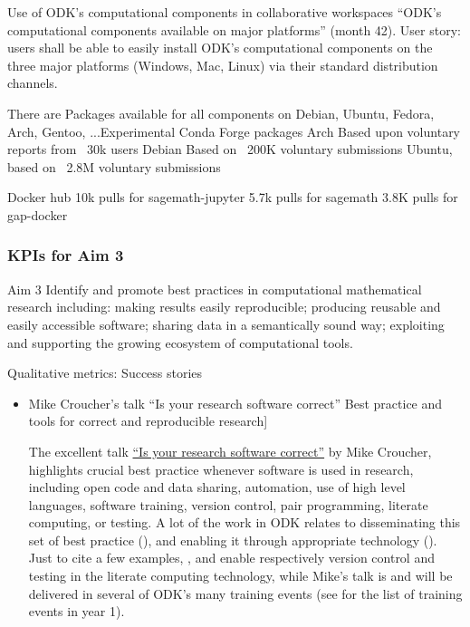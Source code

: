 \begin{Aim 1}
\begin{Aim 2}
Use of ODK's computational components in collaborative workspaces
“ODK’s computational components available on major platforms” (month 42).
       User story: users shall be able to easily install ODK’s computational components on the three major platforms (Windows, Mac, Linux)
       via their standard distribution channels.
       
       There are Packages available for all components on Debian, Ubuntu, Fedora, Arch, Gentoo, ...Experimental Conda Forge packages  %
      Arch Based upon voluntary reports from ~30k users %
      Debian Based on ~200K voluntary submissions %
      Ubuntu, based on ~2.8M voluntary submissions %
      
      Docker hub 
          10k pulls for sagemath-jupyter
          5.7k pulls for sagemath
          3.8K pulls for gap-docker

      
\subsubsection{KPIs for Aim 3}

\begin{recommendation}{Aim 3}
  Identify and promote best practices in computational mathematical research including: making results easily reproducible; producing
  reusable and easily accessible software; sharing data in a semantically sound way; exploiting and supporting the growing
  ecosystem of computational tools.
\end{recommendation}

Qualitative metrics: Success stories
\begin{itemize}
\item Mike Croucher's talk ``Is your research software correct''
Best practice and tools for correct and reproducible research]
        
        The excellent talk \href{https://mikecroucher.github.io/MLPM_talk/}{``Is your research software correct''} by Mike 
         Croucher, highlights crucial best practice whenever software is used in research, including open code and data sharing, 
         automation, use of high level languages, software training, version control, pair programming, literate computing, or testing. A 
         lot of the work in ODK relates to disseminating this set of best practice (), and enabling it through appropriate 
         technology ().  Just to cite a few examples, , and  
         enable respectively version control and testing in the \Jupyter literate computing technology, while Mike's talk is and will be 
         delivered in several of ODK's many training events (see  for the list of training events in year 
         1).
         

\end{itemize}
\end{Aim 2}
\end{Aim 1}
